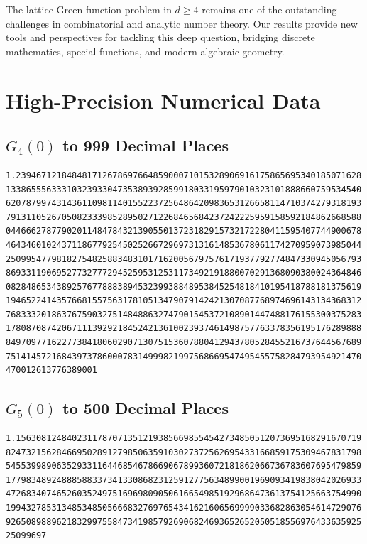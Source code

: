 \documentclass[12pt,a4paper]{article}
\numberwithin{equation}{section}
\theoremstyle{plain}
\theoremstyle{definition}
\theoremstyle{remark}
\begin{document}
The lattice Green function problem in $d \geq 4$ remains one of the outstanding challenges in
combinatorial and analytic number theory. Our results provide new tools and perspectives for
tackling this deep question, bridging discrete mathematics, special functions, and modern
algebraic geometry.

\appendix

\section{High-Precision Numerical Data}\label{app:data}

\subsection{$G_4(0)$ to 999 Decimal Places}

\begin{small}
\begin{verbatim}
1.23946712184848171267869766485900071015328906916175865695340185071628
1338655563331032393304735389392859918033195979010323101888660759534540
6207879974314361109811401552237256486420983653126658114710374279318193
7913110526705082333985289502712268465684237242225959158592184862668588
0446662787790201148478432139055013723182915732172280411595407744900678
4643460102437118677925450252667296973131614853678061174270959073985044
2509954779818275482588348310171620056797576171937792774847330945056793
8693311906952773277729452595312531173492191880070291368090380024364846
0828486534389257677888389453239938848953845254818410195418788181375619
1946522414357668155756317810513479079142421307087768974696143134368312
7683332018637675903275148488632747901545372108901447488176155300375283
1780870874206711139292184524213610023937461498757763378356195176289888
8497097716227738418060290713075153607880412943780528455216737644567689
7514145721684397378600078314999821997568669547495455758284793954921470
470012613776389001
\end{verbatim}
\end{small}

\subsection{$G_5(0)$ to 500 Decimal Places}

\begin{small}
\begin{verbatim}
1.15630812484023117870713512193856698554542734850512073695168291670719
8247321562846695028912798506359103027372562695433166859175309467831798
5455399890635293311644685467866906789936072181862066736783607695479859
1779834892488858833734133086823125912775634899001969093419838042026933
4726834074652603524975169698090506166549851929686473613754125663754990
1994327853134853485056668327697654341621606569999033682863054614729076
9265089889621832997558473419857926906824693652652050518556976433635925
25099697
\end{verbatim}
\end{small}
\end{document}
